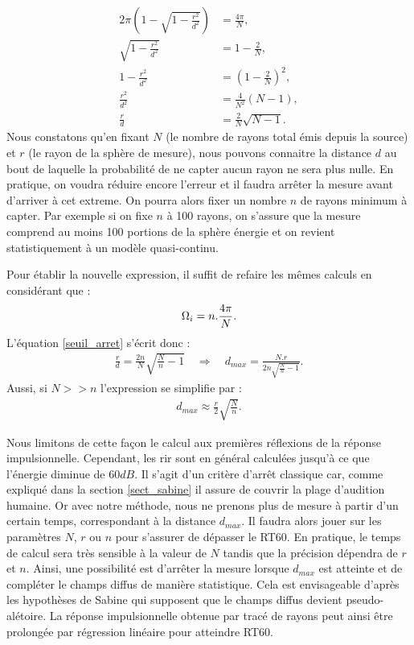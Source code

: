 \begin{align} 
	2\pi \left(1-\sqrt{1-\frac{r^2}{d^2}} \right) &= \frac{4\pi}{N} \nonumber,\\	
	\sqrt{1-\frac{r^2}{d^2}} &= 1-\frac{2}{N} \nonumber,\\
	1-\frac{r^2}{d^2} &= \left(1-\frac{2}{N}\right)^2 \nonumber,\\
	\frac{r^2}{d^2} &= \frac{4}{N^2}(N-1) \nonumber,\\
	 \frac{r}{d} &=  \frac{2}{N} \sqrt{N-1}. \label{seuil_arret}
\end{align}
%
Nous constatons qu'en fixant $N$ (le nombre de rayons total émis depuis la source) et $r$ (le rayon de la sphère de mesure), nous pouvons connaitre la distance $d$ au bout de laquelle la probabilité de ne capter aucun rayon ne sera plus nulle. En pratique, on voudra réduire encore l'erreur et il faudra arrêter la mesure avant d'arriver à cet extreme. On pourra alors fixer un nombre $n$ de rayons minimum à capter. Par exemple si on fixe $n$ à 100 rayons, on s'assure que la mesure comprend au moins 100 portions de la sphère énergie et on revient statistiquement à un modèle quasi-continu.


Pour établir la nouvelle expression, il suffit de refaire les mêmes calculs en considérant que :
\begin{equation}
	\Omega_i = n.\frac{4\pi}{N}. \\
\end{equation}
%
L'équation \ref{seuil_arret} s'écrit donc :
\begin{align} 
	\frac{r}{d} =  \frac{2n}{N} \sqrt{\frac{N}{n}-1} %
 	\quad \Rightarrow  \quad %
	 d_{max} =  \frac{N.r}{2n\sqrt{\frac{N}{n}-1}}.
\end{align}
%
Aussi, si $N >> n$ l'expression se simplifie par : 
\begin{align} \label{eq_dmax}
	 d_{max} \approx  \frac{r}{2} \sqrt{\frac{N}{n}}.
\end{align}

Nous limitons de cette façon le calcul aux premières réflexions de la réponse impulsionnelle. Cependant, les \gls{rir} sont en général calculées jusqu'à ce que l'énergie diminue de $60dB$. Il s'agit d'un critère d'arrêt classique car, comme expliqué dans la section \ref{sect_sabine} il assure de couvrir la plage d'audition humaine. Or avec notre méthode, nous ne prenons plus de mesure à partir d'un certain temps, correspondant à la distance $d_{max}$. Il faudra alors jouer sur les paramètres $N$, $r$ ou $n$ pour s'assurer de dépasser le \gls{RT60}. En pratique, le temps de calcul sera très sensible à la valeur de $N$ tandis que la précision dépendra de $r$ et $n$. Ainsi, une possibilité est d'arrêter la mesure lorsque $d_{max}$ est atteinte et de compléter le champs diffus de manière statistique. Cela est envisageable d'après les hypothèses de Sabine qui supposent que le champs diffus devient pseudo-alétoire. La réponse impulsionnelle obtenue par tracé de rayons peut ainsi être prolongée par régression linéaire pour atteindre \gls{RT60}. \\





